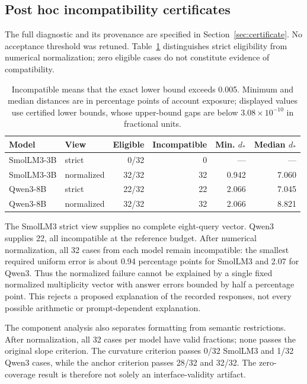 \subsection{Post hoc incompatibility certificates}\label{sec:certificate-results}

The full diagnostic and its provenance are specified in Section~\ref{sec:certificate}. No acceptance threshold was retuned. Table~\ref{tab:incompatibility} distinguishes strict eligibility from numerical normalization; zero eligible cases do not constitute evidence of compatibility.

\begin{table}[H]\centering\small
\begin{tabular}{@{}llrrrr@{}}\toprule
Model & View & Eligible & Incompatible & Min. $d_*$ & Median $d_*$\\\midrule
SmolLM3-3B & strict & 0/32 & 0 & --- & ---\\
SmolLM3-3B & normalized & 32/32 & 32 & 0.942 & 7.060\\
Qwen3-8B & strict & 22/32 & 22 & 2.066 & 7.045\\
Qwen3-8B & normalized & 32/32 & 32 & 2.066 & 8.821\\
\bottomrule\end{tabular}
\caption{Incompatible means that the exact lower bound exceeds 0.005. Minimum and median distances are in percentage points of account exposure; displayed values use certified lower bounds, whose upper-bound gaps are below $3.08\times10^{-10}$ in fractional units.}\label{tab:incompatibility}\end{table}

The SmolLM3 strict view supplies no complete eight-query vector. Qwen3 supplies 22, all incompatible at the reference budget. After numerical normalization, all 32 cases from each model remain incompatible: the smallest required uniform error is about 0.94 percentage points for SmolLM3 and 2.07 for Qwen3. Thus the normalized failure cannot be explained by a single fixed normalized multiplicity vector with answer errors bounded by half a percentage point. This rejects a proposed explanation of the recorded responses, not every possible arithmetic or prompt-dependent explanation.

The component analysis also separates formatting from semantic restrictions. After normalization, all 32 cases per model have valid fractions; none passes the original slope criterion. The curvature criterion passes 0/32 SmolLM3 and 1/32 Qwen3 cases, while the anchor criterion passes 28/32 and 32/32. The zero-coverage result is therefore not solely an interface-validity artifact.

